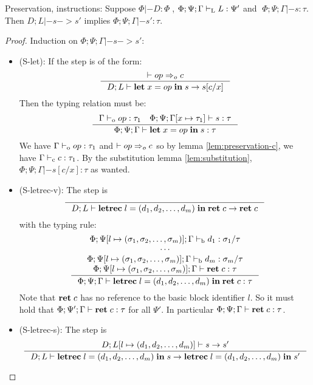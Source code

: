 \documentclass[a4paper, oneside, 10pt, draft]{memoir}
\begin{document}
\begin{lem}{Preservation, instructions:}
  \label{lem:preservation-i}
  Suppose $\Phi |- D : \Phi \;$, $\Phi;\Psi;\Gamma |-_{\mathrm{L}} L : \Psi'$ and
  $\; \Phi;\Psi;\Gamma |- s : \tau$. Then $D;L |- s -> s'$ implies
  $\Phi;\Psi;\Gamma |- s' : \tau$.
\end{lem}
\begin{proof}
  Induction on $\Phi;\Psi;\Gamma |- s -> s'$:
  \begin{itemize}
  \item (S-let): If the step is of the form:
    \begin{equation*}
      \inference{|- op \eop c}{D;L |- \ilet{x}{op}{s} -> s[c/x]}
    \end{equation*}
    Then the typing relation must be:
    \begin{equation*}
    \inference{\Gamma \tpop op : \tau_1 \quad \Phi ; \Psi ;
      \Gamma[x \mapsto \tau_1] |- s : \tau}{\Phi ; \Psi ; \Gamma |-
      \ilet{x}{op}{s} : \tau}
    \end{equation*}
    We have $\Gamma |-_{\mathrm{o}} op : \tau_1$ and $|- op =>_{o} c$ so by lemma
    \ref{lem:preservation-c}, we have $\Gamma |-_{\mathrm{c}} c : \tau_1$. By the
    substitution lemma \ref{lem:substitution}, $\Phi;\Psi;\Gamma |-
    s[c/x] : \tau$ as wanted.
  \item (S-letrec-v):
    The step is
    \begin{equation*}
      \inference{}{D;L |- \iletrec{l}{\dbundle}
        {\iret{c}} -> \iret{c}}
    \end{equation*}
    with the typing rule:
    \begin{equation*}
    \inference{\Phi;\Psi[l \mapsto \bbtypes];\Gamma \tpb d_1 :
      \sigma_1 / \tau\\
      \dotsb\\
      \Phi;\Psi[l \mapsto \bbtypes];\Gamma \tpb d_m : \sigma_m / \tau\\
      \Phi;\Psi[l \mapsto \bbtypes];\Gamma |- \iret{c} : \tau}
       {\Phi;\Psi;\Gamma |- \iletrec{l}{\dbundle}{\iret{c}} : \tau}
    \end{equation*}
    Note that $\mathbf{ret} \; c$ has no reference to the basic block
    identifier $l$. So it must hold that $\Phi;\Psi';\Gamma |-
    \mathbf{ret} \; c : \tau$ for all $\Psi'$. In particular $\Phi;\Psi;\Gamma
    |- \mathbf{ret} \; c : \tau$.
  \item (S-letrec-s):
    The step is
      \begin{equation*}
        \inference{D;L[l \mapsto \dbundle] |- s -> s'}
        {D;L |- \iletrec{l}{\dbundle}{s} -> \iletrec{l}{\dbundle}{s'}}

\end{equation*}
\end{itemize}
\end{proof}
\end{document}
